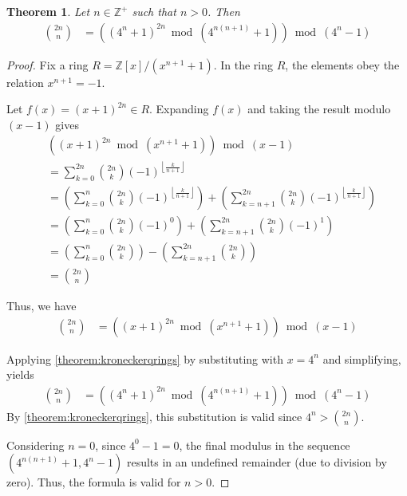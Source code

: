\documentclass[11pt,reqno]{article}
\theoremstyle{plain}
\newtheorem{theorem}{Theorem}
\theoremstyle{definition}
\newcommand{\floor}[1]{\left\lfloor #1 \right\rfloor}
\begin{document}
\begin{theorem} \label{theorem:cbc}
Let $n \in \mathbb{Z}^+$ such that $n > 0$. Then
\begin{align*}
\binom{2n}{n} &= ((4^n + 1)^{2n} \bmod{(4^{n(n+1)} + 1)}) \bmod{(4^n-1)}
\end{align*}
\end{theorem}
\begin{proof}
Fix a ring $R = \mathbb{Z}[x]/(x^{n+1} + 1)$. In the ring $R$, the elements obey the relation $x^{n+1} = -1$.

Let $f(x) = (x + 1)^{2n} \in R$. Expanding $f(x)$ and taking the result modulo $(x-1)$ gives
\begin{align*}
& ((x + 1)^{2n} \bmod{(x^{n+1} + 1)}) \bmod{(x-1)} \\
&= \sum_{k=0}^{2n} \binom{2n}{k} (-1)^{\floor{\frac{k}{n+1}}} \\
&= \left( \sum_{k=0}^{n} \binom{2n}{k} (-1)^{\floor{\frac{k}{n+1}}} \right) + \left( \sum_{k=n+1}^{2n} \binom{2n}{k} (-1)^{\floor{\frac{k}{n+1}}} \right) \\
&= \left( \sum_{k=0}^{n} \binom{2n}{k} (-1)^0 \right) + \left( \sum_{k=n+1}^{2n} \binom{2n}{k} (-1)^1 \right) \\
&= \left( \sum_{k=0}^{n} \binom{2n}{k} \right) - \left( \sum_{k=n+1}^{2n} \binom{2n}{k} \right) \\
&= \binom{2n}{n}
\end{align*}

Thus, we have
\begin{align*}
    \binom{2n}{n} &= ((x + 1)^{2n} \bmod{(x^{n+1} + 1)}) \bmod{(x-1)}
\end{align*}

Applying \cref{theorem:kroneckerqrings} by substituting with $x = 4^n$ and simplifying, yields
\begin{align*}
    \binom{2n}{n} &= ((4^n + 1)^{2n} \bmod{(4^{n(n+1)} + 1)}) \bmod{(4^n-1)}
\end{align*}
By \cref{theorem:kroneckerqrings}, this substitution is valid since $4^n > \binom{2n}{n}$.

Considering $n = 0$, since $4^0-1 = 0$, the final modulus in the sequence $(4^{n(n+1)} + 1, 4^n-1)$ results in an undefined remainder (due to division by zero). Thus, the formula is valid for $n > 0$.
\end{proof}
\end{document}
